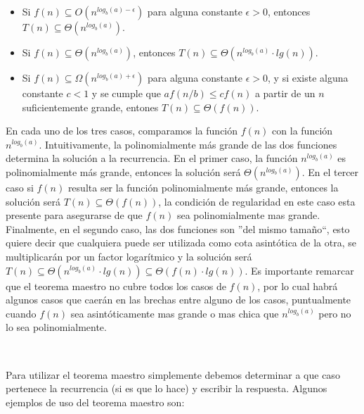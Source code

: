 \begin{itemize}
 \item Si $f(n) \subseteq O(n^{log_b(a)-\epsilon})$ para alguna constante $\epsilon > 0$, entonces $T(n) \subseteq \Theta(n^{log_b(a)})$.
 \item Si $f(n) \subseteq \Theta(n^{log_b(a)})$, entonces $T(n) \subseteq \Theta(n^{log_b(a)} \cdot lg(n))$.
 \item Si $f(n) \subseteq \Omega(n^{log_b(a)+\epsilon})$ para alguna constante $\epsilon > 0$, y si existe alguna constante $c < 1$ y se cumple que $af(n/b) \leq cf(n)$ a partir de un $n$ suficientemente grande, entones $T(n) \subseteq \Theta(f(n))$.
\end{itemize}

En cada uno de los tres casos, comparamos la funci\'on $f(n)$ con la funci\'on $n^{log_b(a)}$. Intuitivamente, la polinomialmente m\'as grande de las dos funciones determina la soluci\'on a la recurrencia. En el primer caso, la funci\'on $n^{log_b(a)}$ es polinomialmente m\'as grande, entonces la soluci\'on ser\'a $\Theta(n^{log_b(a)})$. En el tercer caso si $f(n)$ resulta ser la funci\'on polinomialmente m\'as grande, entonces la soluci\'on ser\'a $T(n) \subseteq \Theta(f(n))$, la condici\'on de regularidad en este caso esta presente para asegurarse de que $f(n)$ sea polinomialmente mas grande. Finalmente, en el segundo caso, las dos funciones son ''del mismo tama\~no``, esto quiere decir que cualquiera puede ser utilizada como cota asint\'otica de la otra, se multiplicar\'an por un factor logar\'itmico y la soluci\'on ser\'a $T(n) \subseteq \Theta(n^{log_b(a)} \cdot lg(n)) \subseteq \Theta(f(n) \cdot lg(n))$. Es importante remarcar que el teorema maestro no cubre todos los casos de $f(n)$, por lo cual habr\'a algunos casos que caer\'an en las brechas entre alguno de los casos, puntualmente cuando $f(n)$ sea asint\'oticamente mas grande o mas chica que $n^{log_b(a)}$ pero no lo sea polinomialmente.

~

Para utilizar el teorema maestro simplemente debemos determinar a que caso pertenece la recurrencia (si es que lo hace) y escribir la respuesta. Algunos ejemplos de uso del teorema maestro son:


